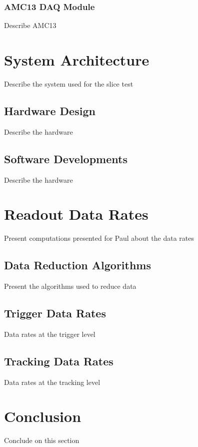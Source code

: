             \subsubsection{AMC13 DAQ Module}

                Describe AMC13

    \section{System Architecture}

        Describe the system used for the slice test

        \subsection{Hardware Design}

            Describe the hardware

        \subsection{Software Developments}

            Describe the hardware

    \section{Readout Data Rates}

        Present computations presented for Paul about the data rates

        \subsection{Data Reduction Algorithms}

            Present the algorithms used to reduce data

        \subsection{Trigger Data Rates}

            Data rates at the trigger level

        \subsection{Tracking Data Rates}

            Data rates at the tracking level

    \section{Conclusion}

        Conclude on this section

